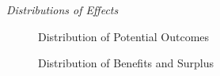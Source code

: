 
\begin{frame}\begin{center}
		\LARGE\textit{Distributions of Effects}
\end{center}\end{frame}
\begin{frame}
	\begin{figure}\caption{Distribution of Potential Outcomes}
	\end{figure}
\end{frame}
\begin{frame}
	\begin{figure}\caption{Distribution of Benefits and Surplus}
	\end{figure}
\end{frame}
